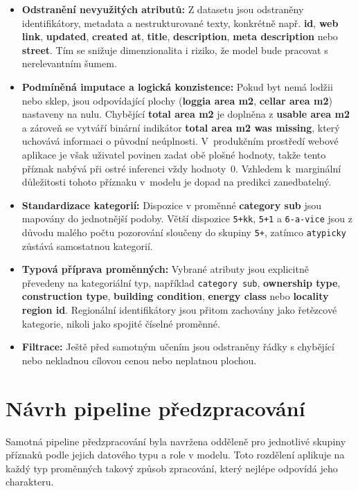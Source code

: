 \begin{itemize}
    \item \textbf{Odstranění nevyužitých atributů:} Z datasetu jsou odstraněny identifikátory, metadata a nestrukturované texty, konkrétně např. \textbf{id}, \textbf{web link}, \textbf{updated}, \textbf{created at}, \textbf{title}, \textbf{description}, \textbf{meta description} nebo \textbf{street}. Tím se snižuje dimenzionalita i riziko, že model bude pracovat s nerelevantním šumem.
    \item \textbf{Podmíněná imputace a logická konzistence:} Pokud byt nemá lodžii nebo sklep, jsou odpovídající plochy (\textbf{loggia area m2}, \textbf{cellar area m2}) nastaveny na nulu. Chybějící \textbf{total area m2} je doplněna z \textbf{usable area m2} a zároveň se vytváří binární indikátor \textbf{total area m2 was missing}, který uchovává informaci o původní neúplnosti. V~produkčním prostředí webové aplikace je však uživatel povinen zadat obě plošné hodnoty, takže tento příznak nabývá při ostré inferenci vždy hodnoty~0. Vzhledem k~marginální důležitosti tohoto příznaku v~modelu je dopad na predikci zanedbatelný.
    \item \textbf{Standardizace kategorií:} Dispozice v proměnné \textbf{category sub} jsou mapovány do jednotnější podoby. Větší dispozice \texttt{5+kk}, \texttt{5+1} a \texttt{6-a-vice} jsou z důvodu malého počtu pozorování sloučeny do skupiny \texttt{5+}, zatímco \texttt{atypicky} zůstává samostatnou kategorií.
    \item \textbf{Typová příprava proměnných:} Vybrané atributy jsou explicitně převedeny na kategoriální typ, například \texttt{category sub}, \textbf{ownership type}, \textbf{construction type}, \textbf{building condition}, \textbf{energy class} nebo \textbf{locality region id}. Regionální identifikátory jsou přitom zachovány jako řetězcové kategorie, nikoli jako spojité číselné proměnné.
    \item \textbf{Filtrace:} Ještě před samotným učením jsou odstraněny řádky s chybějící nebo nekladnou cílovou cenou nebo neplatnou plochou.

\end{itemize}


\section*{Návrh pipeline předzpracování}

Samotná pipeline předzpracování byla navržena odděleně pro jednotlivé skupiny příznaků podle jejich datového typu a role v modelu. Toto rozdělení aplikuje na každý typ proměnných takový způsob zpracování, který nejlépe odpovídá jeho charakteru.

